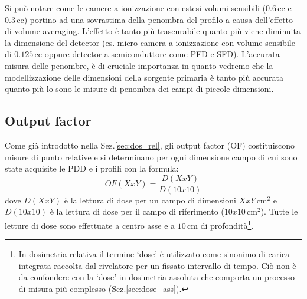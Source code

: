 Si può notare come le camere a ionizzazione con estesi volumi sensibili ($0.6\,$cc e $0.3\,$cc) portino ad una sovrastima della penombra del profilo a causa dell'effetto di volume-averaging. L'effetto è tanto più trascurabile quanto più viene diminuita la dimensione del detector (es. micro-camera a ionizzazione con volume sensibile di $0.125\,$cc oppure detector a semiconduttore come PFD e SFD). L'accurata misura delle penombre, è di cruciale importanza in quanto vedremo che la modellizzazione delle dimensioni della sorgente primaria è tanto più accurata quanto più lo sono le misure di penombra dei campi di piccole dimensioni.

\subsection{Output factor}
Come già introdotto nella Sez.\ref{sec:dos_rel}, gli output factor (OF) costituiscono misure di punto relative e si determinano per ogni dimensione campo di cui sono state acquisite le PDD e i profili con la formula:
\begin{equation}
\label{eq:OF}
OF(XxY)=\frac{D(XxY)}{D(10x10)}
\end{equation}
dove $D(XxY)$ è la lettura di dose per un campo di dimensioni $XxY\,$cm$^2$ e $D(10x10)$ è la lettura di dose per il campo di riferimento ($10x10\,$cm$^2$). Tutte le letture di dose sono effettuate a centro asse e a $10\,$cm di profondità\footnote{In dosimetria relativa il termine `dose' è utilizzato come sinonimo di carica integrata raccolta dal rivelatore per un fissato intervallo di tempo.  Ciò non è da confondere con la `dose' in dosimetria assoluta che comporta un processo di misura più complesso (Sez.\ref{sec:dose_ass}).}.

